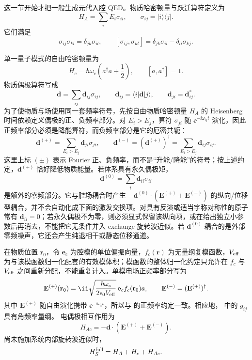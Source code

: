 \label{sec:phys-oqs-manifoldmodels}
这一节开始才把一般生成元代入腔 QED。物质哈密顿量与跃迁算符定义为
\begin{equation}
H_A=\sum_iE_i\sigma_{ii},
\qquad
\sigma_{ij}=|i\rangle\langle j|.
\label{eq:phys-oqs-atomic-h-general}
\end{equation}
它们满足
\[
\sigma_{ij}\sigma_{kl}=\delta_{jk}\sigma_{il},
\qquad
[\sigma_{ij},\sigma_{kl}]
=\delta_{jk}\sigma_{il}-\delta_{li}\sigma_{kj}.
\]

单一量子模式的自由哈密顿量为
\begin{equation}
H_c=\hbar\omega_c\left(a^\dagger a+\frac12\right),
\qquad [a,a^\dagger]=1.
\label{eq:phys-oqs-cavity-h}
\end{equation}
物质偶极算符写成
\[
\mathbf d=\sum_{ij}\mathbf d_{ij}\sigma_{ij},
\qquad
\mathbf d_{ij}=\langle i|\mathbf d|j\rangle,
\qquad
\mathbf d_{ji}=\mathbf d_{ij}^*.
\]
为了使物质与场使用同一套频率符号，先按自由物质哈密顿量 $H_A$ 的 Heisenberg 时间依赖定义偶极的正、负频率部分。对 $E_i>E_j$，算符 $\sigma_{ji}$ 随 $\ee^{-\ii\omega_{ij}t}$ 演化，因此正频率部分必须是降能算符，而负频率部分是它的厄密共轭：
\begin{equation}
\mathbf d^{(+)}=\sum_{E_i>E_j}\mathbf d_{ji}\sigma_{ji},
\qquad
\mathbf d^{(-)}=(\mathbf d^{(+)})^\dagger
=\sum_{E_i>E_j}\mathbf d_{ij}\sigma_{ij}.
\label{eq:phys-oqs-dipole-positive-negative}
\end{equation}
这里上标 $(\pm)$ 表示 Fourier 正、负频率，而不是“升能/降能”的符号；按上述约定，$\mathbf d^{(+)}$ 恰好降低物质能量。若体系具有永久偶极矩，
\[
\mathbf d^{(0)}=\sum_i\mathbf d_{ii}\sigma_{ii}
\]
是额外的零频部分。它与腔场耦合时产生 $-\mathbf d^{(0)}\cdot(\mathbf E^{(+)}+\mathbf E^{(-)})$ 的纵向/位移型耦合，并不会自动化成下面的激发交换项。对具有反演或适当宇称对称性的原子常有 $\mathbf d_{ii}=0$；若永久偶极不为零，则必须显式保留该纵向项，或在给出独立小参数后再消去，不能把它无条件并入 exchange 旋转波近似。若 $\mathbf d^{(0)}$ 耦合的是外部零频噪声，它还会产生纯退相干或静态位移通道。

在物质位置 $\mathbf r_0$，令 $\mathbf e_c$ 为腔模的单位偏振向量，$f_c(\mathbf r)$ 为无量纲复模函数，$V_{\rm eff}$ 为与该模函数归一化配套的有效模体积；模函数的整体归一化约定只允许在 $f_c$ 与 $V_{\rm eff}$ 之间重新分配，不能重复计入。单模电场正频率部分写为
\begin{equation}
\mathbf E^{(+)}(\mathbf r_0)
=\ii\sqrt{\frac{\hbar\omega_c}{2\epsilon_0V_{\rm eff}}}
\,\mathbf e_c f_c(\mathbf r_0)a,
\qquad
\mathbf E^{(-)}=(\mathbf E^{(+)})^\dagger.
\label{eq:phys-oqs-cavity-field}
\end{equation}
其中 $\mathbf E^{(+)}$ 随自由演化携带 $\ee^{-\ii\omega_ct}$，所以与 的正频率约定一致。相应地， 中的 $g_{ij}$ 具有角频率量纲。
电偶极相互作用为
\begin{equation}
H_{Ac}=-\mathbf d\cdot(\mathbf E^{(+)}+\mathbf E^{(-)}).
\label{eq:phys-oqs-dipole-interaction}
\end{equation}
尚未施加系统内部旋转波近似时，
\begin{equation}
H_S^{\rm full}=H_A+H_c+H_{Ac}.
\label{eq:phys-oqs-hs-full}
\end{equation}

